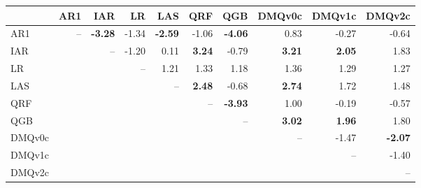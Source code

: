\begin{tabular}{lrrrrrrrrr}
\toprule
 & AR1 & IAR & LR & LAS & QRF & QGB & DMQv0c & DMQv1c & DMQv2c \\
\midrule
AR1 & -- & \textbf{-3.28} & -1.34 & \textbf{-2.59} & -1.06 & \textbf{-4.06} & 0.83 & -0.27 & -0.64 \\
IAR &  & -- & -1.20 & 0.11 & \textbf{3.24} & -0.79 & \textbf{3.21} & \textbf{2.05} & 1.83 \\
LR &  &  & -- & 1.21 & 1.33 & 1.18 & 1.36 & 1.29 & 1.27 \\
LAS &  &  &  & -- & \textbf{2.48} & -0.68 & \textbf{2.74} & 1.72 & 1.48 \\
QRF &  &  &  &  & -- & \textbf{-3.93} & 1.00 & -0.19 & -0.57 \\
QGB &  &  &  &  &  & -- & \textbf{3.02} & \textbf{1.96} & 1.80 \\
DMQv0c &  &  &  &  &  &  & -- & -1.47 & \textbf{-2.07} \\
DMQv1c &  &  &  &  &  &  &  & -- & -1.40 \\
DMQv2c &  &  &  &  &  &  &  &  & -- \\
\bottomrule
\end{tabular}
